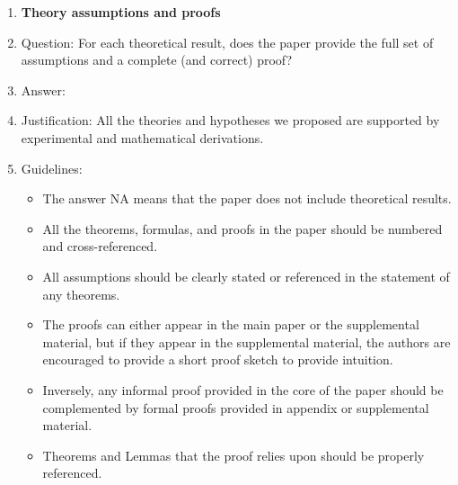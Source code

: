 \documentclass{article}
\begin{document}
\begin{enumerate}
\item {\bf Theory assumptions and proofs}
    \item[] Question: For each theoretical result, does the paper provide the full set of assumptions and a complete (and correct) proof?
    \item[] Answer: \answerYes{} %
    \item[] Justification: All the theories and hypotheses we proposed are supported by experimental and mathematical derivations.
    \item[] Guidelines:
    \begin{itemize}
        \item The answer NA means that the paper does not include theoretical results. 
        \item All the theorems, formulas, and proofs in the paper should be numbered and cross-referenced.
        \item All assumptions should be clearly stated or referenced in the statement of any theorems.
        \item The proofs can either appear in the main paper or the supplemental material, but if they appear in the supplemental material, the authors are encouraged to provide a short proof sketch to provide intuition. 
        \item Inversely, any informal proof provided in the core of the paper should be complemented by formal proofs provided in appendix or supplemental material.
        \item Theorems and Lemmas that the proof relies upon should be properly referenced. 
    \end{itemize}


\end{enumerate}
\end{document}
